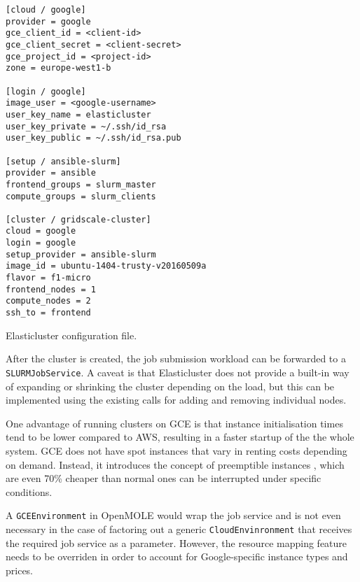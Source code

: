\begin{listing}[h]
	\centering
	\begin{minipage}{8cm}
		\begin{verbatim}
[cloud / google]
provider = google
gce_client_id = <client-id>
gce_client_secret = <client-secret>
gce_project_id = <project-id>
zone = europe-west1-b	

[login / google]
image_user = <google-username>
user_key_name = elasticluster
user_key_private = ~/.ssh/id_rsa
user_key_public = ~/.ssh/id_rsa.pub

[setup / ansible-slurm]
provider = ansible
frontend_groups = slurm_master
compute_groups = slurm_clients

[cluster / gridscale-cluster]
cloud = google
login = google
setup_provider = ansible-slurm
image_id = ubuntu-1404-trusty-v20160509a
flavor = f1-micro
frontend_nodes = 1
compute_nodes = 2
ssh_to = frontend
		\end{verbatim}
	\end{minipage}
	\caption{Elasticluster configuration file.}
	\label{ElastiClusterConfig}
\end{listing}

After the cluster is created, the job submission workload can be forwarded to a \verb|SLURMJobService|. A caveat is that Elasticluster does not provide a built-in way of expanding or shrinking the cluster depending on the load, but this can be implemented using the existing calls for adding and removing individual nodes.

One advantage of running clusters on GCE is that instance initialisation times tend to be lower compared to AWS, resulting in a faster startup of the the whole system. GCE does not have spot instances that vary in renting costs depending on demand. Instead, it introduces the concept of preemptible instances \cite{Preemptible}, which are even 70\% cheaper than normal ones can be interrupted under specific conditions.

A \verb|GCEEnvironment| in OpenMOLE would wrap the job service and is not even necessary in the case of factoring out a generic \verb|CloudEnvinronment| that receives the required job service as a parameter. However, the resource mapping feature needs to be overriden in order to account for Google-specific instance types and prices.